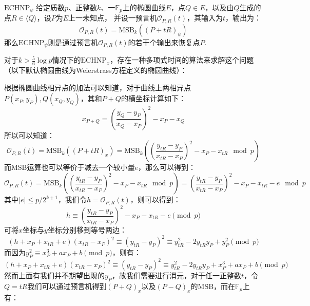 \documentclass{book}
\numberwithin{equation}{subsubsection}
\begin{document}
\begin{concept}{$\text{ECHNP}_{\psi}$}
    给定质数$p$、正整数$k$、一$\mathbb{F}_{p}$上的椭圆曲线$E$，点$Q\in{E}$，以及由$Q$生成的点$R\in{\langle Q\rangle}$，设$P$为$E$上一未知点，
    并设一预言机$\mathcal{O}_{P,R}(t)$，其输入为$t$，输出为：
    \begin{equation}
        \mathcal{O}_{P,R}(t)=\text{MSB}_k((P+tR)_{\psi})
        \nonumber
    \end{equation}
    那么$\text{ECHNP}_{\psi}$则是通过预言机$\mathcal{O}_{P,R}(t)$的若干个输出来恢复点$P$.\par
\end{concept}
对于$k>\frac{5}{6}\log{p}$情况下的$\text{ECHNP}_{x}$，存在一种多项式时间的算法来求解这个问题（以下默认椭圆曲线为Weierstrass方程定义的椭圆曲线）：\par
根据椭圆曲线相异点的加法可以知道，对于曲线上两相异点$P(x_P,y_P),Q(x_Q,y_Q)$，其和$P+Q$的横坐标计算如下：
\begin{equation}
    x_{P+Q}=\left(\frac{y_Q-y_P}{x_Q-x_P}\right)^2-x_P-x_Q
    \nonumber
\end{equation}
所以可以知道：
\begin{equation}
    \mathcal{O}_{P,R}(t)=\text{MSB}_k((P+tR)_{x})=\text{MSB}_k\left(\left(\frac{y_{tR}-y_P}{x_{tR}-x_P}\right)^2-x_P-x_{tR}\mod{p}\right)
    \nonumber
\end{equation}
而MSB运算也可以等价于减去一个较小量$e$，那么可以得到：
\begin{equation}
    \mathcal{O}_{P,R}(t)=\text{MSB}_k\left(\left(\frac{y_{tR}-y_P}{x_{tR}-x_P}\right)^2-x_P-x_{tR}\mod{p}\right)=\left(\frac{y_{tR}-y_P}{x_{tR}-x_P}\right)^2-x_P-x_{tR}-e\mod{p}
    \nonumber
\end{equation}
其中$|e|\le p/2^{k+1}$，我们令$h=\mathcal{O}_{P,R}(t)$，则可以得到：
\begin{equation}
    h\equiv\left(\frac{y_{tR}-y_P}{x_{tR}-x_P}\right)^2-x_P-x_{tR}-e\pmod{p}
    \nonumber
\end{equation}
可将$x$坐标与$y$坐标分别移到等号两边：
\begin{equation}
    (h+x_P+x_{tR}+e)(x_{tR}-x_P)^2\equiv(y_{tR}-y_P)^2\equiv y_{tR}^2-2y_{tR}y_{P}+y_{P}^2\pmod{p}
    \nonumber
\end{equation}
而因为$y_P^2\equiv x_P^3+ax_P+b\pmod{p}$，则有：
\begin{equation}
    (h+x_P+x_{tR}+e)(x_{tR}-x_P)^2\equiv(y_{tR}-y_P)^2\equiv y_{tR}^2-2y_{tR}y_{P}+x_P^3+ax_P+b\pmod{p}
    \nonumber
\end{equation}
然而上面有我们并不期望出现的$y_P$，故我们需要进行消元，对于任一正整数$t$，令$Q=tR$我们可以通过预言机得到$(P+Q)_x$以及$(P-Q)_x$的MSB，而在$\mathbb{F}_p$上有：
\end{document}
